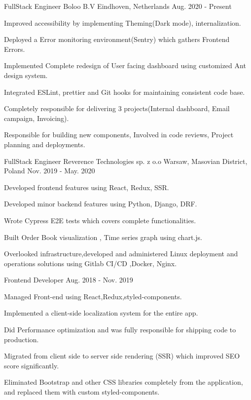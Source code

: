 \begin{cventries}

  \cventry
    {FullStack Engineer}
    {Boloo B.V}
    {Eindhoven, Netherlands}
    {Aug. 2020 - Present}
    {
      \begin{cvitems}
        \item {Improved accessibility by implementing Theming(Dark mode), internalization.}      
        \item {Deployed a Error monitoring environment(Sentry) which gathers Frontend Errors.}
        \item {Implemented Complete redesign of User facing dashboard using customized Ant design system.}
        \item {Integrated ESLint, prettier and Git hooks for maintaining consistent code base.}
        \item {Completely responsible for delivering 3 projects(Internal dashboard, Email campaign, Invoicing).}
        \item {Responsible for building new components, Involved in code reviews, Project planning and deployments.}
      \end{cvitems}
    }

  \cventry
    {FullStack Engineer}
    {Reverence Technologies sp. z o.o}
    {Warsaw, Masovian District, Poland}
    {Nov. 2019 - May. 2020}
    {
      \begin{cvitems}
        \item { Developed frontend features using React, Redux, SSR.}
        \item { Developed minor backend features using Python, Django, DRF.}
        \item { Wrote Cypress E2E tests which covers complete functionalities.}
        \item { Built Order Book visualization , Time series graph using chart.js.}
        \item { Overlooked infrastructure,developed and administered Linux deployment and
        operations solutions using Gitlab CI/CD ,Docker, Nginx.}
        \end{cvitems}
    }

  \cventry
    {Frontend Developer}
    {}
    {}
    {Aug. 2018 - Nov. 2019}
    {
      \begin{cvitems}
        \item { Managed Front-end using React,Redux,styled-components.}
        \item { Implemented a client-side localization system for the entire app.}
        \item { Did Performance optimization and was fully responsible for shipping code to production.}
        \item { Migrated from client side to server side rendering (SSR) which improved SEO score
        significantly.}
        \item { Eliminated Bootstrap and other CSS libraries completely from the application,
        and replaced them with custom styled-components.}
        \end{cvitems}
    }


\end{cventries}
